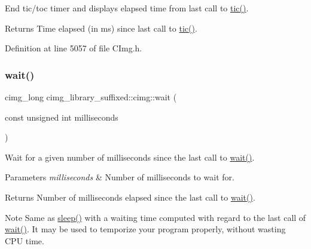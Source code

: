 End tic/toc timer and displays elapsed time from last call to \hyperlink{namespacecimg__library__suffixed_1_1cimg_a5bd41788a0caabcc16754f18b3454321}{tic()}. 

\begin{DoxyReturn}{Returns}
Time elapsed (in ms) since last call to \hyperlink{namespacecimg__library__suffixed_1_1cimg_a5bd41788a0caabcc16754f18b3454321}{tic()}. 
\end{DoxyReturn}


Definition at line 5057 of file C\+Img.\+h.

\mbox{\label{namespacecimg__library__suffixed_1_1cimg_a8431f8cf0989f40df3b6ac7d9dc90abd}} 
\subsubsection{\texorpdfstring{wait()}{wait()}}
{\footnotesize\ttfamily cimg\+\_\+long cimg\+\_\+library\+\_\+suffixed\+::cimg\+::wait (\begin{DoxyParamCaption}\item[{const unsigned int}]{milliseconds }\end{DoxyParamCaption})\hspace{0.3cm}{\ttfamily [inline]}}



Wait for a given number of milliseconds since the last call to \hyperlink{namespacecimg__library__suffixed_1_1cimg_a8431f8cf0989f40df3b6ac7d9dc90abd}{wait()}. 


\begin{DoxyParams}{Parameters}
{\em milliseconds} & Number of milliseconds to wait for. \\
\hline
\end{DoxyParams}
\begin{DoxyReturn}{Returns}
Number of milliseconds elapsed since the last call to \hyperlink{namespacecimg__library__suffixed_1_1cimg_a8431f8cf0989f40df3b6ac7d9dc90abd}{wait()}. 
\end{DoxyReturn}
\begin{DoxyNote}{Note}
Same as \hyperlink{namespacecimg__library__suffixed_1_1cimg_aa2bf8fb0d97c122cbc52e1f2e167e8a6}{sleep()} with a waiting time computed with regard to the last call of \hyperlink{namespacecimg__library__suffixed_1_1cimg_a8431f8cf0989f40df3b6ac7d9dc90abd}{wait()}. It may be used to temporize your program properly, without wasting C\+PU time. 
\end{DoxyNote}


